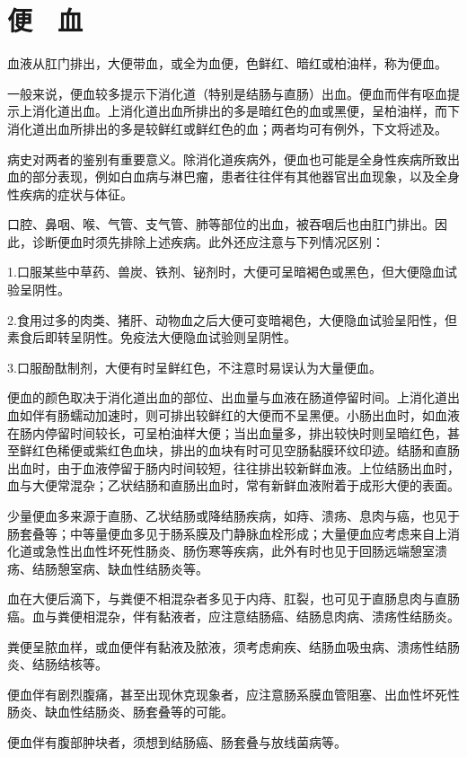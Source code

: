 \chapter{便　血}

血液从肛门排出，大便带血，或全为血便，色鲜红、暗红或柏油样，称为便血。

一般来说，便血较多提示下消化道（特别是结肠与直肠）出血。便血而伴有呕血提示上消化道出血。上消化道出血所排出的多是暗红色的血或黑便，呈柏油样，而下消化道出血所排出的多是较鲜红或鲜红色的血；两者均可有例外，下文将述及。

病史对两者的鉴别有重要意义。除消化道疾病外，便血也可能是全身性疾病所致出血的部分表现，例如白血病与淋巴瘤，患者往往伴有其他器官出血现象，以及全身性疾病的症状与体征。

口腔、鼻咽、喉、气管、支气管、肺等部位的出血，被吞咽后也由肛门排出。因此，诊断便血时须先排除上述疾病。此外还应注意与下列情况区别：

1.口服某些中草药、兽炭、铁剂、铋剂时，大便可呈暗褐色或黑色，但大便隐血试验呈阴性。

2.食用过多的肉类、猪肝、动物血之后大便可变暗褐色，大便隐血试验呈阳性，但素食后即转呈阴性。免疫法大便隐血试验则呈阴性。

3.口服酚酞制剂，大便有时呈鲜红色，不注意时易误认为大量便血。

便血的颜色取决于消化道出血的部位、出血量与血液在肠道停留时间。上消化道出血如伴有肠蠕动加速时，则可排出较鲜红的大便而不呈黑便。小肠出血时，如血液在肠内停留时间较长，可呈柏油样大便；当出血量多，排出较快时则呈暗红色，甚至鲜红色稀便或紫红色血块，排出的血块有时可见空肠黏膜环纹印迹。结肠和直肠出血时，由于血液停留于肠内时间较短，往往排出较新鲜血液。上位结肠出血时，血与大便常混杂；乙状结肠和直肠出血时，常有新鲜血液附着于成形大便的表面。

少量便血多来源于直肠、乙状结肠或降结肠疾病，如痔、溃疡、息肉与癌，也见于肠套叠等；中等量便血多见于肠系膜及门静脉血栓形成；大量便血应考虑来自上消化道或急性出血性坏死性肠炎、肠伤寒等疾病，此外有时也见于回肠远端憩室溃疡、结肠憩室病、缺血性结肠炎等。

血在大便后滴下，与粪便不相混杂者多见于内痔、肛裂，也可见于直肠息肉与直肠癌。血与粪便相混杂，伴有黏液者，应注意结肠癌、结肠息肉病、溃疡性结肠炎。

粪便呈脓血样，或血便伴有黏液及脓液，须考虑痢疾、结肠血吸虫病、溃疡性结肠炎、结肠结核等。

便血伴有剧烈腹痛，甚至出现休克现象者，应注意肠系膜血管阻塞、出血性坏死性肠炎、缺血性结肠炎、肠套叠等的可能。

便血伴有腹部肿块者，须想到结肠癌、肠套叠与放线菌病等。

